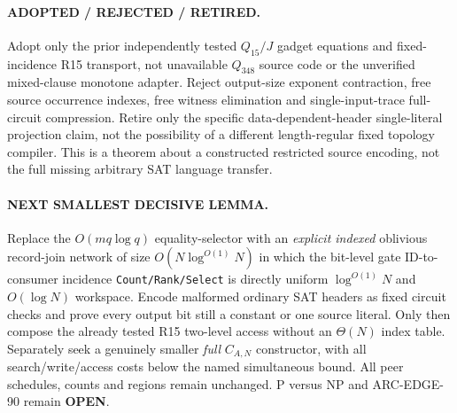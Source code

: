\documentclass[11pt]{article}
\begin{document}
\paragraph{ADOPTED / REJECTED / RETIRED.} Adopt only the prior independently tested $Q_{15}/J$ gadget equations and fixed-incidence R15 transport, not unavailable $Q_{348}$ source code or the unverified mixed-clause monotone adapter. Reject output-size exponent contraction, free source occurrence indexes, free witness elimination and single-input-trace full-circuit compression. Retire only the specific data-dependent-header single-literal projection claim, not the possibility of a different length-regular fixed topology compiler. This is a theorem about a constructed restricted source encoding, not the full missing arbitrary SAT language transfer.

\paragraph{NEXT SMALLEST DECISIVE LEMMA.} Replace the $O(mq\log q)$ equality-selector with an \emph{explicit indexed} oblivious record-join network of size $O(N\log^{O(1)}N)$ in which the bit-level gate ID-to-consumer incidence \texttt{Count/Rank/Select} is directly uniform $\log^{O(1)}N$ and $O(\log N)$ workspace. Encode malformed ordinary SAT headers as fixed circuit checks and prove every output bit still a constant or one source literal. Only then compose the already tested R15 two-level access without an $\Theta(N)$ index table. Separately seek a genuinely smaller \emph{full} $C_{A,N}$ constructor, with all search/write/access costs below the named simultaneous bound. All peer schedules, counts and regions remain unchanged. P versus NP and ARC-EDGE-90 remain \textbf{OPEN}.



\end{document}
